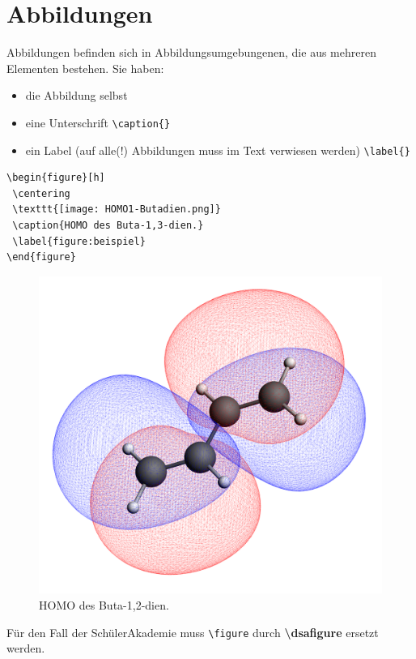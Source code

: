 \section{Abbildungen}
Abbildungen befinden sich in Abbildungsumgebungenen, die
aus mehreren Elementen bestehen. Sie haben:

\begin{itemize}
 \item die Abbildung selbst
 \item eine Unterschrift \lstinline$\caption{}$
 \item ein Label (auf alle(!) Abbildungen muss im Text verwiesen werden)
       \lstinline$\label{}$
\end{itemize}

\begin{lstlisting}
\begin{figure}[h]
 \centering
 \texttt{[image: HOMO1-Butadien.png]}
 \caption{HOMO des Buta-1,3-dien.}
 \label{figure:beispiel}
\end{figure}
\end{lstlisting}

\begin{figure}[h]
 \centering
 \includegraphics[scale=0.02]{HOMO1-Buten.png}
 \caption{HOMO des Buta-1,2-dien.}
 \label{figure:beispiel}
\end{figure}

\danger Für den Fall der SchülerAkademie muss \lstinline$\figure$ durch
        \textbf{\textbackslash dsafigure} ersetzt werden.
